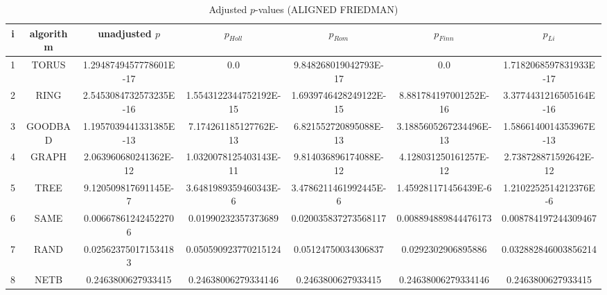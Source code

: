 \documentclass[a4paper,10pt]{article}
\begin{document}
\begin{landscape}
\begin{table}[!htp]
\centering\scriptsize
\caption{Adjusted $p$-values (ALIGNED FRIEDMAN)}
\begin{tabular}{ccccccc}
i&algorithm&unadjusted $p$&$p_{Holl}$&$p_{Rom}$&$p_{Finn}$&$p_{Li}$\\
\hline
1& TORUS&1.2948749457778601E-17&0.0&9.848268019042793E-17&0.0&1.7182068597831933E-17\\
2& RING&2.5453084732573235E-16&1.5543122344752192E-15&1.6939746428249122E-15&8.881784197001252E-16&3.3774431216505164E-16\\
3& GOODBAD&1.1957039441331385E-13&7.174261185127762E-13&6.821552720895088E-13&3.1885605267234496E-13&1.5866140014353967E-13\\
4& GRAPH&2.063960680241362E-12&1.0320078125403143E-11&9.814036896174088E-12&4.128031250161257E-12&2.738728871592642E-12\\
5& TREE&9.120509817691145E-7&3.6481989359460343E-6&3.4786211461992445E-6&1.459281171456439E-6&1.2102252514212376E-6\\
6& SAME&0.006678612424522706&0.01990232357373689&0.020035837273568117&0.008894889844476173&0.008784197244309467\\
7& RAND&0.025623750171534183&0.050590923770215124&0.05124750034306837&0.0292302906895886&0.032882846003856214\\
8& NETB&0.2463800627933415&0.24638006279334146&0.2463800627933415&0.24638006279334146&0.2463800627933415\\
\hline
\end{tabular}
\end{table}


\newpage


\end{landscape}
\end{document}
